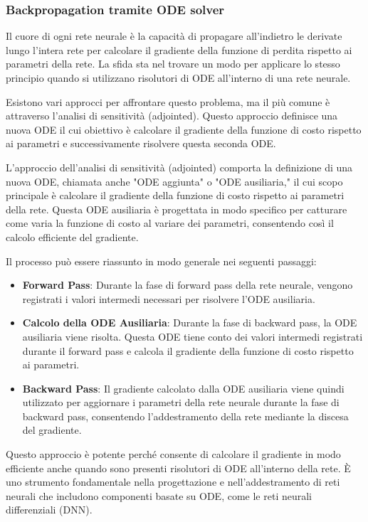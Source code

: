 \subsubsection{Backpropagation tramite ODE solver}

Il cuore di ogni rete neurale è la capacità di propagare all'indietro 
le derivate lungo l'intera rete per calcolare il gradiente della 
funzione di perdita rispetto ai parametri della rete. La sfida sta nel 
trovare un modo per applicare lo stesso principio quando si utilizzano 
risolutori di ODE all'interno di una rete neurale.

Esistono vari approcci per affrontare questo problema, ma il più comune 
è attraverso l'analisi di sensitività (adjointed). Questo approccio 
definisce una nuova ODE il cui obiettivo è calcolare il gradiente della 
funzione di costo rispetto ai parametri e successivamente risolvere 
questa seconda ODE.

L'approccio dell'analisi di sensitività (adjointed) comporta la 
definizione di una nuova ODE, chiamata anche "ODE aggiunta" o 
"ODE ausiliaria," il cui scopo principale è calcolare il gradiente 
della funzione di costo rispetto ai parametri della rete. 
Questa ODE ausiliaria è progettata in modo specifico per catturare 
come varia la funzione di costo al variare dei parametri, 
consentendo così il calcolo efficiente del gradiente.

Il processo può essere riassunto in modo generale nei seguenti passaggi:

\begin{itemize}
    \item \textbf{Forward Pass}: Durante la fase di forward pass 
    della rete neurale, vengono registrati i valori intermedi 
    necessari per risolvere l'ODE ausiliaria.
    \item \textbf{Calcolo della ODE Ausiliaria}: Durante la fase di 
    backward pass, la ODE ausiliaria viene risolta. 
    Questa ODE tiene conto dei valori intermedi registrati durante 
    il forward pass e calcola il gradiente della funzione di costo 
    rispetto ai parametri.
    \item \textbf{Backward Pass}: Il gradiente calcolato dalla ODE 
    ausiliaria viene quindi utilizzato per aggiornare i parametri 
    della rete neurale durante la fase di backward pass, consentendo 
    l'addestramento della rete mediante la discesa del gradiente.
\end{itemize}

Questo approccio è potente perché consente di calcolare il gradiente 
in modo efficiente anche quando sono presenti risolutori di ODE 
all'interno della rete. È uno strumento fondamentale nella progettazione 
e nell'addestramento di reti neurali che includono componenti basate 
su ODE, come le reti neurali differenziali (DNN).

